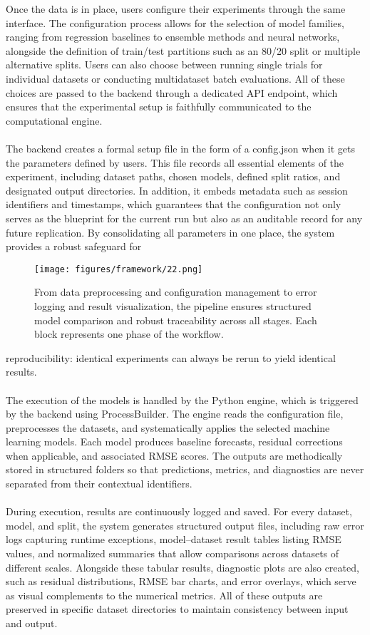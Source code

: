 Once the data is in place, users configure their experiments through the same interface. The configuration process allows for the selection of model families, ranging from regression baselines to ensemble methods and neural networks, alongside the definition of train/test partitions such as an 80/20 split or multiple alternative splits. Users can also choose between running single trials for individual datasets or conducting multidataset batch evaluations. All of these choices are passed to the backend through a dedicated API endpoint, which ensures that the experimental setup is faithfully communicated to the computational engine.
\\\\The backend creates a formal setup file in the form of a config.json when it gets the parameters defined by users. This file records all essential elements of the experiment, including dataset paths, chosen models, defined split ratios, and designated output directories. In addition, it embeds metadata such as session identifiers and timestamps, which guarantees that the configuration not only serves as the blueprint for the current run but also as an auditable record for any future replication. By consolidating all parameters in one place, the system provides a robust safeguard for 
\begin{figure}[H]
\centering
 \texttt{[image: figures/framework/22.png]}
 \caption[Automated machine learning pipeline for multidimensional sensor time series data.]{From data preprocessing and configuration management to error logging and result visualization, the pipeline ensures structured model comparison and robust traceability across all stages. Each block represents one phase of the workflow.}
 \label{fig:ml_pipeline}
\end{figure}
reproducibility: identical experiments can always be rerun to yield identical results.
\\\\The execution of the models is handled by the Python engine, which is triggered by the backend using ProcessBuilder. The engine reads the configuration file, preprocesses the datasets, and systematically applies the selected machine learning models. Each model produces baseline forecasts, residual corrections when applicable, and associated RMSE scores. The outputs are methodically stored in structured folders so that predictions, metrics, and diagnostics are never separated from their contextual identifiers.
\\\\During execution, results are continuously logged and saved. For every dataset, model, and split, the system generates structured output files, including raw error logs capturing runtime exceptions, model–dataset result tables listing RMSE values, and normalized summaries that allow comparisons across datasets of different scales. Alongside these tabular results, diagnostic plots are also created, such as residual distributions, RMSE bar charts, and error overlays, which serve as visual complements to the numerical metrics. All of these outputs are preserved in specific dataset  directories to maintain consistency between input and output.
